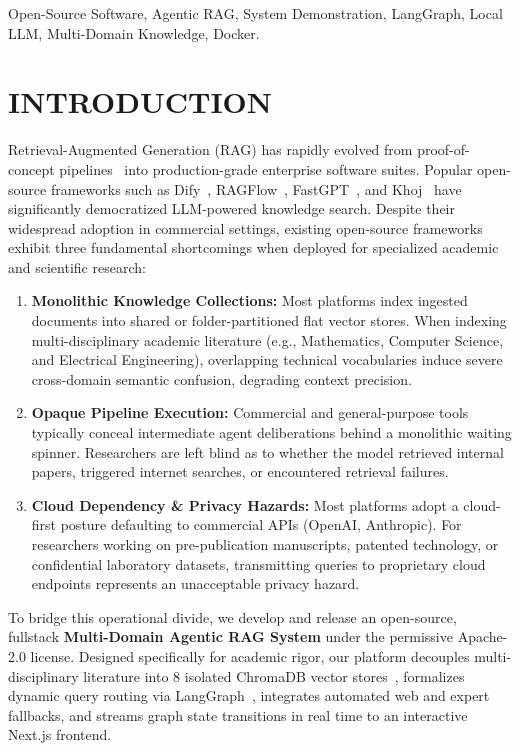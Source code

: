 \documentclass[conference]{IEEEtran}
\begin{document}
\begin{IEEEkeywords}
Open-Source Software, Agentic RAG, System Demonstration, LangGraph, Local LLM, Multi-Domain Knowledge, Docker.
\end{IEEEkeywords}

\section{INTRODUCTION}
Retrieval-Augmented Generation (RAG) has rapidly evolved from proof-of-concept pipelines~\cite{lewis2020retrieval} into production-grade enterprise software suites. Popular open-source frameworks such as Dify~\cite{dify2024}, RAGFlow~\cite{ragflow2024}, FastGPT~\cite{fastgpt2024}, and Khoj~\cite{khoj2024} have significantly democratized LLM-powered knowledge search. Despite their widespread adoption in commercial settings, existing open-source frameworks exhibit three fundamental shortcomings when deployed for specialized academic and scientific research:
\begin{enumerate}
    \item \textbf{Monolithic Knowledge Collections:} Most platforms index ingested documents into shared or folder-partitioned flat vector stores. When indexing multi-disciplinary academic literature (e.g., Mathematics, Computer Science, and Electrical Engineering), overlapping technical vocabularies induce severe cross-domain semantic confusion, degrading context precision.
    \item \textbf{Opaque Pipeline Execution:} Commercial and general-purpose tools typically conceal intermediate agent deliberations behind a monolithic waiting spinner. Researchers are left blind as to whether the model retrieved internal papers, triggered internet searches, or encountered retrieval failures.
    \item \textbf{Cloud Dependency \& Privacy Hazards:} Most platforms adopt a cloud-first posture defaulting to commercial APIs (OpenAI, Anthropic). For researchers working on pre-publication manuscripts, patented technology, or confidential laboratory datasets, transmitting queries to proprietary cloud endpoints represents an unacceptable privacy hazard.
\end{enumerate}

To bridge this operational divide, we develop and release an open-source, fullstack \textbf{Multi-Domain Agentic RAG System} under the permissive Apache-2.0 license. Designed specifically for academic rigor, our platform decouples multi-disciplinary literature into 8 isolated ChromaDB vector stores~\cite{chroma2023}, formalizes dynamic query routing via LangGraph~\cite{langgraph2024}, integrates automated web and expert fallbacks, and streams graph state transitions in real time to an interactive Next.js frontend.
\end{document}
